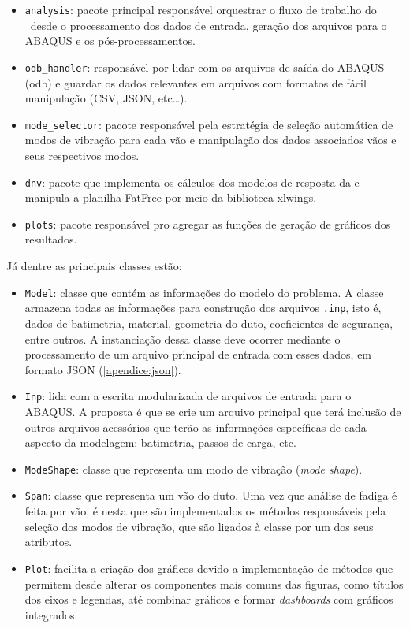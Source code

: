 \begin{itemize}
    \item \texttt{analysis}: pacote principal responsável orquestrar o fluxo de trabalho do \frame\ desde o processamento dos dados de entrada, geração dos arquivos para o ABAQUS e os pós-processamentos.

    \item \texttt{odb\_handler}: responsável por lidar com os arquivos de saída do ABAQUS (odb) e guardar os dados relevantes em arquivos com formatos de fácil manipulação (CSV, JSON, etc\ldots).

    \item \texttt{mode\_selector}: pacote responsável pela estratégia de seleção automática de modos de vibração para cada vão e manipulação dos dados associados vãos e seus respectivos modos.

    \item \texttt{dnv}: pacote que implementa os cálculos dos modelos de resposta da  e manipula a planilha FatFree por meio da biblioteca xlwings.

    \item \texttt{plots}: pacote responsável pro agregar as funções de geração de gráficos dos resultados.
\end{itemize}

Já dentre as principais classes estão:

\begin{itemize}
    \item \texttt{Model}: classe que contém as informações do modelo do problema.
    A classe armazena todas as informações para construção dos arquivos \texttt{.inp}, isto é, dados de batimetria, material, geometria do duto, coeficientes de segurança, entre outros.
    A instanciação dessa classe deve ocorrer mediante o processamento de um arquivo principal de entrada com esses dados, em formato JSON (\autoref{apendice:json}).

    \item \texttt{Inp}: lida com a escrita modularizada de arquivos de entrada  para o ABAQUS. A proposta é que se crie um arquivo principal que terá inclusão de outros arquivos acessórios que terão as informações específicas de cada aspecto da modelagem: batimetria, passos de carga, etc.

    \item \texttt{ModeShape}: classe que representa um modo de vibração (\textit{mode shape}).

    \item \texttt{Span}: classe que representa um vão do duto. Uma vez que análise de fadiga é feita por vão, é nesta que são implementados os métodos responsáveis pela seleção dos modos de vibração, que são ligados à classe por um dos seus atributos.

    \item \texttt{Plot}: facilita a criação dos gráficos devido a implementação de métodos que permitem desde alterar os componentes mais comuns das figuras, como títulos dos eixos e legendas, até combinar gráficos e formar \textit{dashboards} com gráficos integrados.
\end{itemize}

